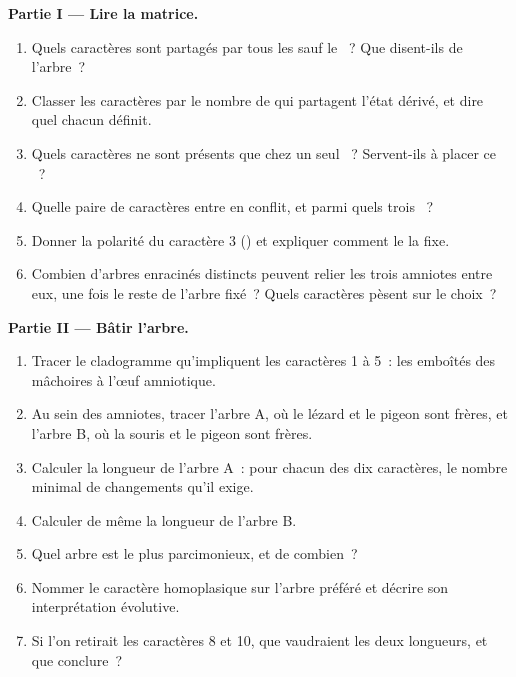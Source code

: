 \begin{problem}
\medskip
\noindent\textbf{Partie I --- Lire la matrice.}
\begin{enumerate}
  \item Quels caractères sont partagés par tous les  sauf le
        ~? Que disent-ils de l'arbre~?
  \item Classer les caractères par le nombre de  qui partagent
        l'état dérivé, et dire quel  chacun définit.
  \item Quels caractères ne sont présents que chez un seul ~?
        Servent-ils à placer ce ~?
  \item Quelle paire de caractères entre en conflit, et parmi quels
        trois ~?
  \item Donner la polarité du caractère 3 () et expliquer
        comment le  la fixe.
  \item Combien d'arbres enracinés distincts peuvent relier les trois
        amniotes entre eux, une fois le reste de l'arbre fixé~? Quels
        caractères pèsent sur le choix~?
\end{enumerate}

\medskip
\noindent\textbf{Partie II --- Bâtir l'arbre.}
\begin{enumerate}[resume]
  \item Tracer le cladogramme qu'impliquent les caractères 1 à 5~: les
         emboîtés des mâchoires à l'œuf amniotique.
  \item Au sein des amniotes, tracer l'arbre A, où le lézard et le
        pigeon sont  frères, et l'arbre B, où la souris et le
        pigeon sont frères.
  \item Calculer la longueur de l'arbre A~: pour chacun des dix
        caractères, le nombre minimal de changements qu'il exige.
  \item Calculer de même la longueur de l'arbre B.
  \item Quel arbre est le plus parcimonieux, et de combien~?
  \item Nommer le caractère homoplasique sur l'arbre préféré et
        décrire son interprétation évolutive.
  \item Si l'on retirait les caractères 8 et 10, que vaudraient les
        deux longueurs, et que conclure~?
\end{enumerate}


\end{problem}
